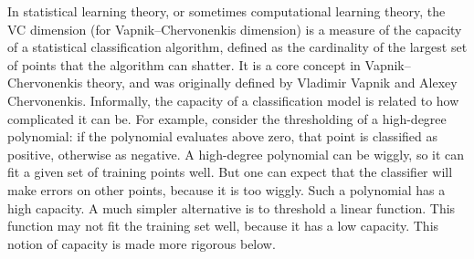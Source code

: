 In statistical learning theory, or sometimes computational learning theory, the VC dimension (for Vapnik–Chervonenkis dimension) is a measure of the capacity of a statistical classification algorithm, defined as the cardinality of the largest set of points that the algorithm can shatter. It is a core concept in Vapnik–Chervonenkis theory, and was originally defined by Vladimir Vapnik and Alexey Chervonenkis.
Informally, the capacity of a classification model is related to how complicated it can be. For example, consider the thresholding of a high-degree polynomial: if the polynomial evaluates above zero, that point is classified as positive, otherwise as negative. A high-degree polynomial can be wiggly, so it can fit a given set of training points well. But one can expect that the classifier will make errors on other points, because it is too wiggly. Such a polynomial has a high capacity. A much simpler alternative is to threshold a linear function. This function may not fit the training set well, because it has a low capacity. This notion of capacity is made more rigorous below.
